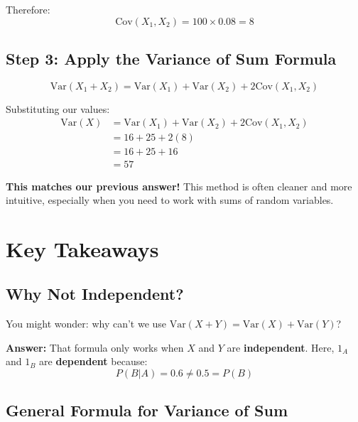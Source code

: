 \documentclass[11pt]{article}
\begin{document}
Therefore:
\begin{equation}
\text{Cov}(X_1, X_2) = 100 \times 0.08 = 8
\end{equation}

\subsection{Step 3: Apply the Variance of Sum Formula}

\begin{tcolorbox}[colback=purple!5!white,colframe=purple!75!black,title=Variance of Sum Formula]
\begin{equation}
\text{Var}(X_1 + X_2) = \text{Var}(X_1) + \text{Var}(X_2) + 2\text{Cov}(X_1, X_2)
\end{equation}
\end{tcolorbox}

Substituting our values:
\begin{align}
\text{Var}(X) &= \text{Var}(X_1) + \text{Var}(X_2) + 2\text{Cov}(X_1, X_2)\\
&= 16 + 25 + 2(8)\\
&= 16 + 25 + 16\\
&= 57
\end{align}

\textbf{This matches our previous answer!} This method is often cleaner and more intuitive, especially when you need to work with sums of random variables.

\section{Key Takeaways}

\subsection{Why Not Independent?}

You might wonder: why can't we use $\text{Var}(X + Y) = \text{Var}(X) + \text{Var}(Y)$?

\textbf{Answer:} That formula only works when $X$ and $Y$ are \textbf{independent}. Here, $1_A$ and $1_B$ are \textbf{dependent} because:
\begin{equation}
P(B|A) = 0.6 \neq 0.5 = P(B)
\end{equation}

\subsection{General Formula for Variance of Sum}
\end{document}
